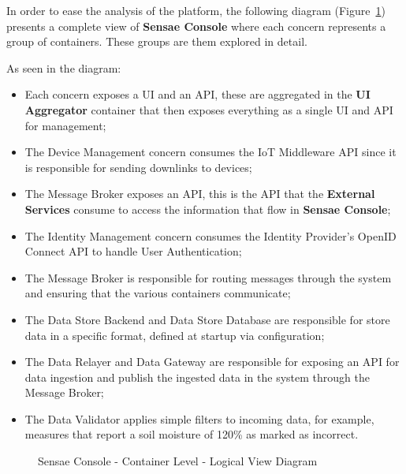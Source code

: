 In order to ease the analysis of the platform, the following diagram (Figure~\ref{fig:design:architecture:platform:containers:logical:complete}) presents a complete view of \textbf{Sensae Console} where each concern represents a group of containers. These groups are them explored in detail.

As seen in the diagram:

\begin{itemize}
   \item Each concern exposes a \gls{UI} and an \gls{API}, these are aggregated in the \textbf{UI Aggregator} container that then exposes everything as a single \gls{UI} and \gls{API} for management;
   \item The Device Management concern consumes the \gls{IoT} Middleware API since it is responsible for sending downlinks to devices;
   \item The Message Broker exposes an \gls{API}, this is the \gls{API} that the \textbf{External Services} consume to access the information that flow in \textbf{Sensae Console};
   \item The Identity Management concern consumes the Identity Provider's OpenID Connect API to handle User Authentication;
   \item The Message Broker is responsible for routing messages through the system and ensuring that the various containers communicate;
   \item The Data Store Backend and Data Store Database are responsible for store data in a specific format, defined at startup via configuration;
   \item The Data Relayer and Data Gateway are responsible for exposing an \gls{API} for data ingestion and publish the ingested data in the system through the Message Broker;
   \item The Data Validator applies simple filters to incoming data, for example, measures that report a soil moisture of 120\% as marked as incorrect.
\end{itemize}

\begin{figure}
   \centering
   \resizebox{0.8\columnwidth}{!}
   {
      
   }
   \caption[Sensae Console - Container Level - Logical View Diagram]{Sensae Console - Container Level - Logical View Diagram}
      \label{fig:design:architecture:platform:containers:logical:complete}
\end{figure}

